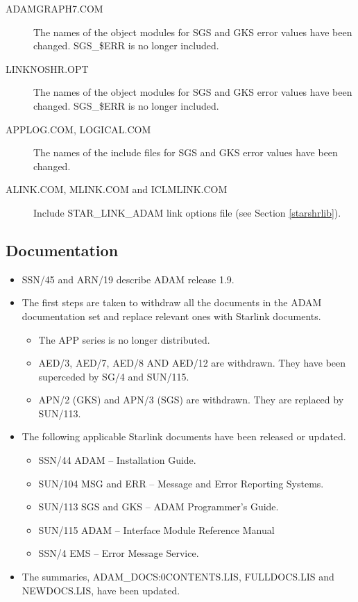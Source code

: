 \begin{description}
\item[ADAMGRAPH7.COM]
The names of the object modules for SGS and GKS error values have been changed.
SGS\_\$ERR is no longer included.

\item[LINKNOSHR.OPT]
The names of the object modules for SGS and GKS error values have been 
changed. SGS\_\$ERR is no longer included.

\item[APPLOG.COM, LOGICAL.COM]
The names of the include files for SGS and GKS error values have been changed.

\item[ALINK.COM, MLINK.COM and ICLMLINK.COM] Include STAR\_LINK\_ADAM link
options file (see Section \ref{starshrlib}).
\end{description}

\subsection{Documentation}
\begin{itemize}

\item SSN/45 and ARN/19 describe ADAM release 1.9.

\item The first steps are taken to withdraw all the documents in the ADAM
documentation set and replace relevant ones with Starlink documents.
\begin{itemize}
\item The APP series is no longer distributed.
\item AED/3, AED/7, AED/8 AND AED/12 are withdrawn. They have been superceded
by SG/4 and SUN/115.
\item APN/2 (GKS) and APN/3 (SGS) are withdrawn. They are replaced by SUN/113.
\end{itemize}

\item The following applicable Starlink documents have been released or
updated.
\begin{itemize}
\item SSN/44 ADAM -- Installation Guide.
\item SUN/104 MSG and ERR -- Message and Error Reporting Systems.
\item SUN/113 SGS and GKS -- ADAM Programmer's Guide.
\item SUN/115 ADAM -- Interface Module Reference Manual
\item SSN/4 EMS -- Error Message Service.
\end{itemize}

\item The summaries, ADAM\_DOCS:0CONTENTS.LIS, FULLDOCS.LIS and NEWDOCS.LIS,
have been updated. 
\end{itemize}


